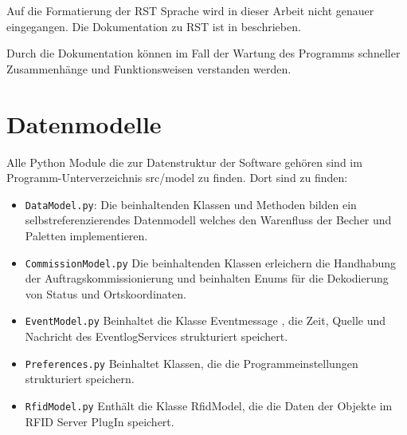 Auf die Formatierung der RST Sprache wird in dieser Arbeit nicht genauer eingegangen. Die Dokumentation zu RST ist in \cite{sphinxRST} beschrieben.

Durch die Dokumentation können im Fall der Wartung des Programms schneller Zusammenhänge und Funktionsweisen verstanden werden. 


\section{Datenmodelle}
Alle Python Module die zur Datenstruktur der Software gehören sind im Programm-Unterverzeichnis \glqq src/model \grqq zu finden. 
Dort sind zu finden: 
\begin{itemize}
    \item \verb|DataModel.py|: Die beinhaltenden Klassen und Methoden bilden ein selbstreferenzierendes Datenmodell welches den \glq Warenfluss \grq der Becher und Paletten implementieren.
    \item \verb|CommissionModel.py| Die beinhaltenden Klassen erleichern die Handhabung der Auftragskommissionierung und beinhalten Enums für die Dekodierung von Status und Ortskoordinaten. 
    \item \verb|EventModel.py| Beinhaltet die Klasse \glqq Eventmessage \grqq , die Zeit, Quelle und Nachricht des EventlogServices strukturiert speichert.
    \item \verb|Preferences.py| Beinhaltet Klassen, die die Programmeinstellungen strukturiert speichern. 
    \item \verb|RfidModel.py| Enthält die Klasse RfidModel, die die Daten der Objekte im RFID Server PlugIn speichert.
\end{itemize}
